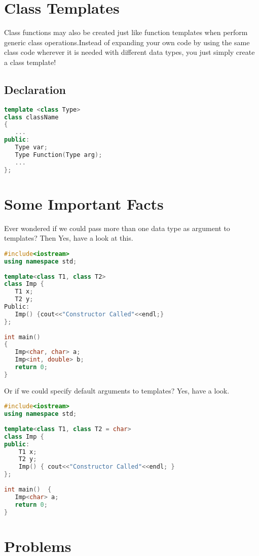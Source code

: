 \documentclass[11pt,fleqn]{book} %
\begin{document}
\section{Class Templates}
Class functions may also be created just like function templates when perform generic class operations.Instead of expanding your own code by using the same class code wherever it is needed with different data types, you just simply create a class template!

\subsection{Declaration}
\begin{lstlisting}[language=C++, caption= Declaration Of Class Templates]
template <class Type>
class className
{
   ...
public:
   Type var;
   Type Function(Type arg);
   ... 
};
\end{lstlisting}

\section{Some Important Facts}

Ever wondered if we could pass more than one data type as argument to templates? Then Yes, have a look at this.

\begin{lstlisting}[language=C++, caption= Important Fact 1]
#include<iostream>
using namespace std;
 
template<class T1, class T2>
class Imp {
   T1 x;
   T2 y;
Public:
   Imp() {cout<<"Constructor Called"<<endl;}
};
 
int main()  
{
   Imp<char, char> a;
   Imp<int, double> b;
   return 0;
}
\end{lstlisting}

Or if we could specify default arguments to templates? Yes, have a look.
\begin{lstlisting}[language=C++, caption= Important Fact 2]
#include<iostream>
using namespace std;
 
template<class T1, class T2 = char>
class Imp {
public:
    T1 x;
    T2 y;
    Imp() { cout<<"Constructor Called"<<endl; }
};
 
int main()  {
   Imp<char> a; 
   return 0;
}
\end{lstlisting}

\section{Problems}
\end{document}
